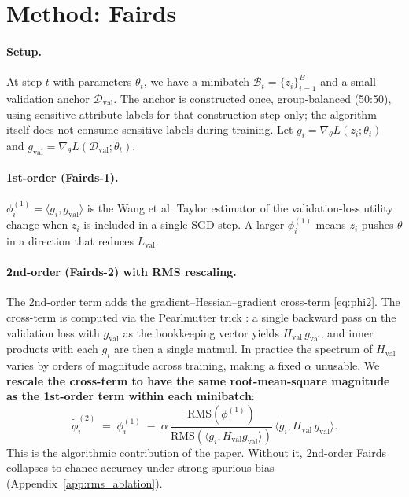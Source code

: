 \section{Method: Fairds}
\label{sec:method}

\paragraph{Setup.}
At step $t$ with parameters $\theta_t$, we have a minibatch
$\mathcal{B}_t = \{z_i\}_{i=1}^B$ and a small validation anchor
$\mathcal{D}_{\mathrm{val}}$. The anchor is constructed once,
group-balanced (50:50), using sensitive-attribute labels for that
construction step only; the algorithm itself does not consume
sensitive labels during training. Let
$g_i = \nabla_\theta L(z_i; \theta_t)$ and
$g_{\mathrm{val}} = \nabla_\theta L(\mathcal{D}_{\mathrm{val}};\theta_t)$.

\paragraph{1st-order (Fairds-1).}
$\phi_i^{(1)} = \langle g_i, g_{\mathrm{val}}\rangle$ is the Wang et al.
Taylor estimator of the validation-loss utility change when $z_i$ is
included in a single SGD step. A larger $\phi_i^{(1)}$ means $z_i$ pushes
$\theta$ in a direction that reduces $L_{\mathrm{val}}$.

\paragraph{2nd-order (Fairds-2) with RMS rescaling.}
The 2nd-order term adds the gradient--Hessian--gradient cross-term
\eqref{eq:phi2}. The cross-term is computed via the Pearlmutter trick
\citep{pearlmutter1994hvp}: a single backward pass on the validation
loss with $g_{\mathrm{val}}$ as the bookkeeping vector yields
$H_{\mathrm{val}}\,g_{\mathrm{val}}$, and inner products with each $g_i$
are then a single matmul. In practice the spectrum of
$H_{\mathrm{val}}$ varies by orders of magnitude across training,
making a fixed $\alpha$ unusable. We \textbf{rescale the cross-term to
have the same root-mean-square magnitude as the 1st-order term within
each minibatch}:
\[
\widetilde\phi_i^{(2)}
\;=\; \phi_i^{(1)} \;-\; \alpha\,
\frac{\mathrm{RMS}(\phi^{(1)})}{\mathrm{RMS}(\langle g_i, H_{\mathrm{val}} g_{\mathrm{val}}\rangle)}
\,\langle g_i, H_{\mathrm{val}}\, g_{\mathrm{val}}\rangle.
\]
This is the algorithmic contribution of the paper. Without it,
2nd-order Fairds collapses to chance accuracy under strong spurious bias
(Appendix~\ref{app:rms_ablation}).

